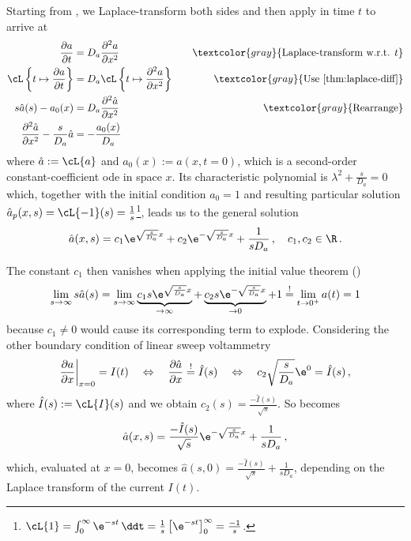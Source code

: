 \documentclass{prettytex/ox/mmsc-special-topic}
\begin{document}
  Starting from , we Laplace-transform both sides and then apply  in time $t$ to arrive at
  \begin{align*}
    \frac{\partial a}{\partial t}                                   & = D_a \frac{\partial^2 a}{\partial x^2} \quad                             & \textcolor{gray}{\text{Laplace-transform w.r.t. } t} \\
    \cL\left\{t \mapsto \frac{\partial a}{\partial t}\right\}       & = D_a \cL\left\{t \mapsto \frac{\partial^2 a}{\partial x^2}\right\} \quad & \textcolor{gray}{\text{Use \Cref{thm:laplace-diff}}} \\
    s \hat{a}(s) - a_0(x)                                           & = D_a \frac{\partial^2 \hat{a}}{\partial x^2} \quad                       & \textcolor{gray}{\text{Rearrange}}                   \\
    \frac{\partial^2 \hat{a}}{\partial x^2} - \frac{s}{D_a} \hat{a} & = -\frac{a_0(x)}{D_a}
  \end{align*}
  where $\hat{a} := \cL\{a\}$ and $a_0(x) := a(x, t=0)$, which is a second-order constant-coefficient \glsdesc{ode} in space $x$. Its characteristic polynomial is $\lambda^2 + \frac{s}{D_a} = 0$ which, together with the initial condition $a_0 = 1$ and resulting particular solution $\hat{a}_p(x, s) = \cL\{-1\}(s) = \frac{1}{s}$\footnote{$\cL\{1\} = \int_{0}^{\infty} \e^{-st} \,\ddt = \frac{1}{s} \left[\e^{-st}\right]_0^\infty = \frac{-1}{s}$.}, leads us to the general solution
  \begin{equation}
    \hat{a}(x, s) = c_1 \e^{\sqrt{\frac{s}{D_a}}x} + c_2 \e^{-\sqrt{\frac{s}{D_a}}x} + \frac{1}{s D_a}\,,\quad c_1, c_2 \in \R\,.
    \label{eq:laplace-pre-solution}
  \end{equation}

  The constant $c_1$ then vanishes when applying the initial value theorem ()
  $$\lim_{s \rightarrow \infty} s \hat{a}(s) = \lim_{s \rightarrow \infty} \underbrace{c_1 s \e^{\sqrt{\frac{s}{D_a}}x}}_{\rightarrow \infty} + \underbrace{c_2 s \e^{-\sqrt{\frac{s}{D_a}}x}}_{\rightarrow 0} + 1 \overset{!}{=} \lim_{t \rightarrow 0^+} a(t) = 1$$
  because $c_1 \neq 0$ would cause its corresponding term to explode. Considering the other boundary condition of linear sweep voltammetry
  $$\frac{\partial a}{\partial x}\bigg|_{x=0} = I(t) \quad \Leftrightarrow \quad \frac{\partial \hat{a}}{\partial x} \overset{!}{=} \hat{I}(s) \quad \Leftrightarrow \quad c_2 \sqrt{\frac{s}{D_a}} \e^{0} = \hat{I}(s)\,,$$
  where $\hat{I}(s) := \cL\{I\}(s)$ and we obtain $c_2(s) = \frac{-\hat{I}(s)}{\sqrt{s}}$.
  So  becomes
  \begin{equation}
    \hat{a}(x, s) = \frac{-\hat{I}(s)}{\sqrt{s}} \e^{-\sqrt{\frac{s}{D_a}}x} + \frac{1}{s D_a}\,,
    \label{eq:laplace-solution}
  \end{equation}
  which, evaluated at $x = 0$, becomes $\hat{a}(s, 0) = \frac{-\hat{I}(s)}{\sqrt{s}} + \frac{1}{s D_a}$, depending on the Laplace transform of the current $I(t)$.
\end{document}
